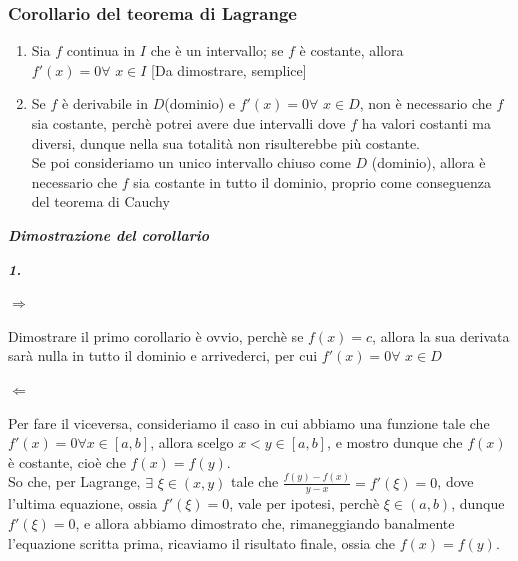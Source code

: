 \documentclass{article}
\theoremstyle{definition}
\begin{document}
\subsubsection{Corollario del teorema di Lagrange}
\begin{enumerate}
    \item Sia $f$ continua in $I$ che è un intervallo; se $f$ è costante, allora $f'(x)=0 \forall \,\, x \in I$
    [Da dimostrare, semplice]
\item Se $f$ è derivabile in $D$(dominio) e $f'(x)=0 \forall \,\, x \in D$, non è necessario che $f$ sia costante, perchè potrei avere due intervalli dove $f$ ha valori costanti ma diversi, dunque nella sua totalità non risulterebbe più costante. 
\\
Se poi consideriamo un unico intervallo chiuso come $D$ (dominio), allora è necessario che $f$ sia costante in tutto il dominio, proprio come conseguenza del teorema di Cauchy
\end{enumerate}
\begin{center}
    \textbf{\textit{Dimostrazione del corollario}}
\end{center}
\begin{center}
    \textbf{\textit{1.}}
\end{center}
\begin{center}
    $\Longrightarrow$
\end{center}
Dimostrare il primo corollario è ovvio, perchè se $f(x)=c$, allora la sua derivata sarà nulla in tutto il dominio e arrivederci, per cui $f'(x)=0 \forall \,\, x \in D$
\begin{center}
    $\Longleftarrow$
\end{center}
Per fare il viceversa, consideriamo il caso in cui abbiamo una funzione tale che $f'(x)=0 \forall x \in [a,b]$, allora scelgo $x<y \in [a,b]$, e mostro dunque che $f(x)$ è costante, cioè che $f(x)=f(y)$.
\\
So che, per Lagrange, $\exists \,\, \xi \in (x,y)$ tale che $\frac{f(y)-f(x)}{y-x}=f'(\xi)=0$, dove l'ultima equazione, ossia $f'(\xi)=0$, vale per ipotesi, perchè $\xi \in (a,b)$, dunque $f'(\xi)=0$, e allora abbiamo dimostrato che, rimaneggiando banalmente l'equazione scritta prima, ricaviamo il risultato finale, ossia che $f(x)=f(y)$.
\end{document}
